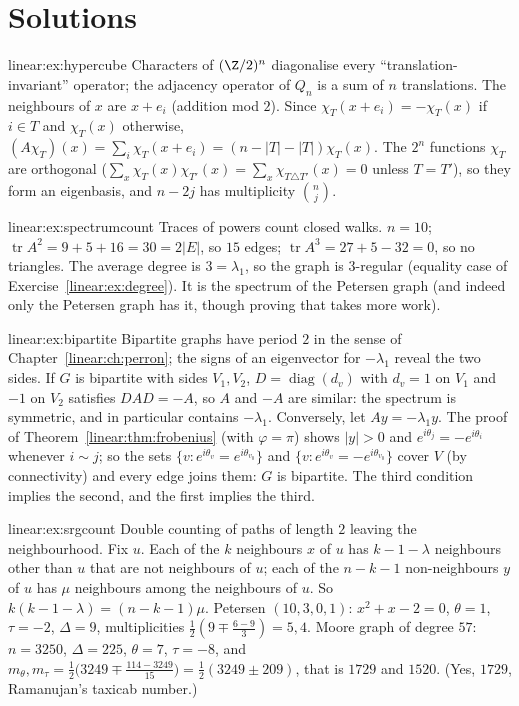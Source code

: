 \section{Solutions}

\begin{solution}{linear:ex:hypercube}
\idea Characters of $(\Z/2)^n$ diagonalise every ``translation-invariant'' operator; the adjacency operator of $Q_n$ is a sum of
$n$ translations.
\writeup The neighbours of $x$ are $x+e_i$ (addition mod $2$). Since $\chi_T(x+e_i)=-\chi_T(x)$ if $i\in T$ and $\chi_T(x)$ otherwise,
$(A\chi_T)(x)=\sum_i\chi_T(x+e_i)=(n-|T|-|T|)\chi_T(x)$. The $2^n$ functions $\chi_T$ are orthogonal ($\sum_x\chi_T(x)\chi_{T'}(x)=
\sum_x\chi_{T\triangle T'}(x)=0$ unless $T=T'$), so they form an eigenbasis, and $n-2j$ has multiplicity $\binom nj$.
\end{solution}

\begin{solution}{linear:ex:spectrumcount}
\idea Traces of powers count closed walks.
\writeup $n=10$; $\operatorname{tr}A^2=9+5+16=30=2|E|$, so $15$ edges; $\operatorname{tr}A^3=27+5-32=0$, so no triangles. The
average degree is $3=\lambda_1$, so the graph is $3$-regular (equality case of Exercise~\ref{linear:ex:degree}). It is the spectrum of the
Petersen graph (and indeed only the Petersen graph has it, though proving that takes more work).
\end{solution}

\begin{solution}{linear:ex:bipartite}
\idea Bipartite graphs have period $2$ in the sense of Chapter~\ref{linear:ch:perron}; the signs of an eigenvector for $-\lambda_1$ reveal the two
sides.
\writeup If $G$ is bipartite with sides $V_1,V_2$, $D=\operatorname{diag}(d_v)$ with $d_v=1$ on $V_1$ and $-1$ on $V_2$ satisfies
$DAD=-A$, so $A$ and $-A$ are similar: the spectrum is symmetric, and in particular contains $-\lambda_1$. Conversely, let $Ay=-\lambda_1y$.
The proof of Theorem~\ref{linear:thm:frobenius} (with $\varphi=\pi$) shows $|y|>0$ and $e^{i\theta_j}=-e^{i\theta_i}$ whenever $i\sim j$; so the
sets $\{v:e^{i\theta_v}=e^{i\theta_{v_0}}\}$ and $\{v:e^{i\theta_v}=-e^{i\theta_{v_0}}\}$ cover $V$ (by connectivity) and every edge joins
them: $G$ is bipartite. The third condition implies the second, and the first implies the third.
\end{solution}

\begin{solution}{linear:ex:srgcount}
\idea Double counting of paths of length $2$ leaving the neighbourhood.
\writeup Fix $u$. Each of the $k$ neighbours $x$ of $u$ has $k-1-\lambda$ neighbours other than $u$ that are not neighbours of $u$; each
of the $n-k-1$ non-neighbours $y$ of $u$ has $\mu$ neighbours among the neighbours of $u$. So $k(k-1-\lambda)=(n-k-1)\mu$. Petersen
$(10,3,0,1)$: $x^2+x-2=0$, $\theta=1$, $\tau=-2$, $\Delta=9$, multiplicities $\frac12(9\mp\frac{6-9}3)=5,4$. Moore graph of degree $57$:
$n=3250$, $\Delta=225$, $\theta=7$, $\tau=-8$, and $m_\theta,m_\tau=\frac12\bigl(3249\mp\frac{114-3249}{15}\bigr)=\frac12(3249\pm209)$, that is
$1729$ and $1520$. (Yes, $1729$, Ramanujan's taxicab number.)
\end{solution}

